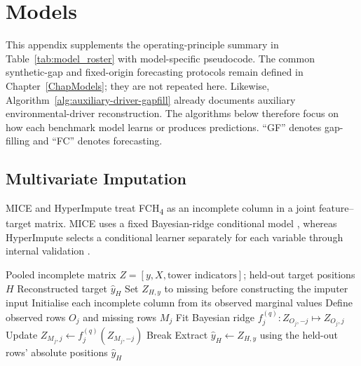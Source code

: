 \chapter{Models}
\label{app:model-algorithms}

This appendix supplements the operating-principle summary in
Table~\ref{tab:model_roster} with model-specific pseudocode. The common
synthetic-gap and fixed-origin forecasting protocols remain defined in
Chapter~\ref{ChapModels}; they are not repeated here. Likewise,
Algorithm~\ref{alg:auxiliary-driver-gapfill} already documents auxiliary
environmental-driver reconstruction. The algorithms below therefore focus on
how each benchmark model learns or produces predictions. ``GF'' denotes
gap-filling and ``FC'' denotes forecasting.

\section{Multivariate Imputation}

MICE and HyperImpute treat FCH\textsubscript{4} as an incomplete column in a
joint feature--target matrix. MICE uses a fixed Bayesian-ridge conditional
model \cite{vanbuuren2011mice}, whereas HyperImpute selects a conditional
learner separately for each variable through internal validation
\cite{jarrett2022hyperimpute}.

\begin{algorithm}[H]
\caption{MICE reconstruction with Bayesian-ridge conditional models}
\label{alg:app-mice}
\small
\begin{algorithmic}[1]
\Require Pooled incomplete matrix $Z=[y,X,\text{tower indicators}]$;
held-out target positions $H$
\Ensure Reconstructed target $\hat y_H$
\State Set $Z_{H,y}$ to missing before constructing the imputer input
\State Initialise each incomplete column from its observed marginal values
        \State Define observed rows $O_j$ and missing rows $M_j$
        \State Fit Bayesian ridge $f_j^{(q)}:Z_{O_j,-j}\mapsto Z_{O_j,j}$
        \State Update $Z_{M_j,j}\gets f_j^{(q)}(Z_{M_j,-j})$
    \EndFor
        \State Break
    \EndIf
\EndFor
\State Extract $\hat y_H\gets Z_{H,y}$ using the held-out rows' absolute positions
\State \Return $\hat y_H$
\end{algorithmic}
\end{algorithm}

